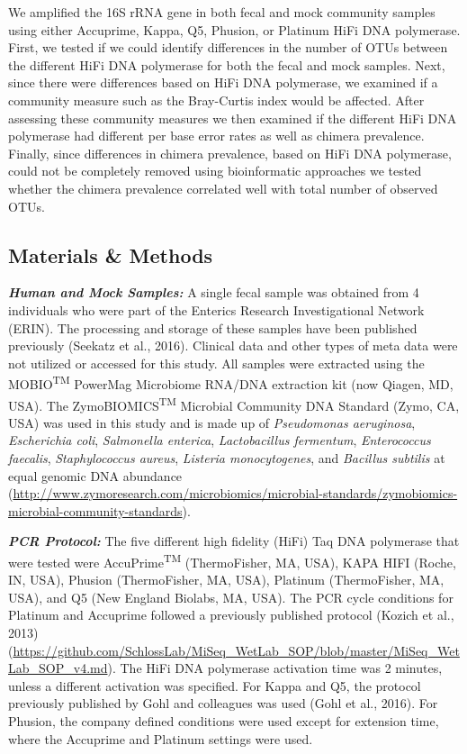 \documentclass[12pt,]{article}
\begin{document}
We amplified the 16S rRNA gene in both fecal and mock community samples
using either Accuprime, Kappa, Q5, Phusion, or Platinum HiFi DNA
polymerase. First, we tested if we could identify differences in the
number of OTUs between the different HiFi DNA polymerase for both the
fecal and mock samples. Next, since there were differences based on HiFi
DNA polymerase, we examined if a community measure such as the
Bray-Curtis index would be affected. After assessing these community
measures we then examined if the different HiFi DNA polymerase had
different per base error rates as well as chimera prevalence. Finally,
since differences in chimera prevalence, based on HiFi DNA polymerase,
could not be completely removed using bioinformatic approaches we tested
whether the chimera prevalence correlated well with total number of
observed OTUs.

\newpage

\subsection{Materials \& Methods}\label{materials-methods}

\textbf{\emph{Human and Mock Samples:}} A single fecal sample was
obtained from 4 individuals who were part of the Enterics Research
Investigational Network (ERIN). The processing and storage of these
samples have been published previously (Seekatz et al., 2016). Clinical
data and other types of meta data were not utilized or accessed for this
study. All samples were extracted using the MOBIO\textsuperscript{TM}
PowerMag Microbiome RNA/DNA extraction kit (now Qiagen, MD, USA). The
ZymoBIOMICS\textsuperscript{TM} Microbial Community DNA Standard (Zymo,
CA, USA) was used in this study and is made up of \emph{Pseudomonas
aeruginosa}, \emph{Escherichia coli}, \emph{Salmonella enterica},
\emph{Lactobacillus fermentum}, \emph{Enterococcus faecalis},
\emph{Staphylococcus aureus}, \emph{Listeria monocytogenes}, and
\emph{Bacillus subtilis} at equal genomic DNA abundance
(\url{http://www.zymoresearch.com/microbiomics/microbial-standards/zymobiomics-microbial-community-standards}).

\textbf{\emph{PCR Protocol:}} The five different high fidelity (HiFi)
Taq DNA polymerase that were tested were AccuPrime\textsuperscript{TM}
(ThermoFisher, MA, USA), KAPA HIFI (Roche, IN, USA), Phusion
(ThermoFisher, MA, USA), Platinum (ThermoFisher, MA, USA), and Q5 (New
England Biolabs, MA, USA). The PCR cycle conditions for Platinum and
Accuprime followed a previously published protocol (Kozich et al., 2013)
(\url{https://github.com/SchlossLab/MiSeq_WetLab_SOP/blob/master/MiSeq_WetLab_SOP_v4.md}).
The HiFi DNA polymerase activation time was 2 minutes, unless a
different activation was specified. For Kappa and Q5, the protocol
previously published by Gohl and colleagues was used (Gohl et al.,
2016). For Phusion, the company defined conditions were used except for
extension time, where the Accuprime and Platinum settings were used.
\end{document}
